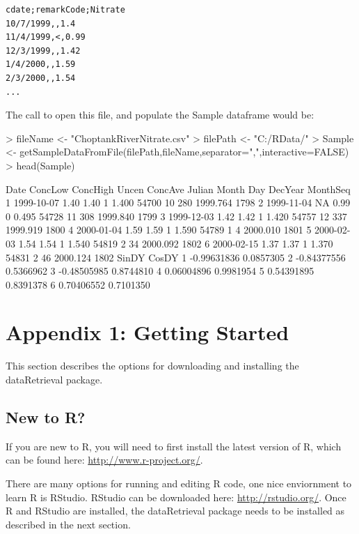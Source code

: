 \documentclass[a4paper,11pt]{article}
\begin{document}
\begin{verbatim}
cdate;remarkCode;Nitrate
10/7/1999,,1.4
11/4/1999,<,0.99
12/3/1999,,1.42
1/4/2000,,1.59
2/3/2000,,1.54
...
\end{verbatim}
The call to open this file, and populate the Sample dataframe would be:
\begin{Schunk}
\begin{Sinput}
> fileName <- "ChoptankRiverNitrate.csv"
> filePath <-  "C:/RData/"
> Sample <- getSampleDataFromFile(filePath,fileName,separator=",",interactive=FALSE)
> head(Sample)
\end{Sinput}
\begin{Soutput}
        Date ConcLow ConcHigh Uncen ConcAve Julian Month Day  DecYear MonthSeq
1 1999-10-07    1.40     1.40     1   1.400  54700    10 280 1999.764     1798
2 1999-11-04      NA     0.99     0   0.495  54728    11 308 1999.840     1799
3 1999-12-03    1.42     1.42     1   1.420  54757    12 337 1999.919     1800
4 2000-01-04    1.59     1.59     1   1.590  54789     1   4 2000.010     1801
5 2000-02-03    1.54     1.54     1   1.540  54819     2  34 2000.092     1802
6 2000-02-15    1.37     1.37     1   1.370  54831     2  46 2000.124     1802
        SinDY     CosDY
1 -0.99631836 0.0857305
2 -0.84377556 0.5366962
3 -0.48505985 0.8744810
4  0.06004896 0.9981954
5  0.54391895 0.8391378
6  0.70406552 0.7101350
\end{Soutput}
\end{Schunk}


\newpage
\section{Appendix 1: Getting Started}
This section describes the options for downloading and installing the dataRetrieval package.

\subsection{New to R?}
If you are new to R, you will need to first install the latest version of R, which can be found here: \url{http://www.r-project.org/}.

There are many options for running and editing R code, one nice enviornment to learn R is RStudio. RStudio can be downloaded here: \url{http://rstudio.org/}. Once R and RStudio are installed, the dataRetrieval package needs to be installed as described in the next section.
\end{document}
